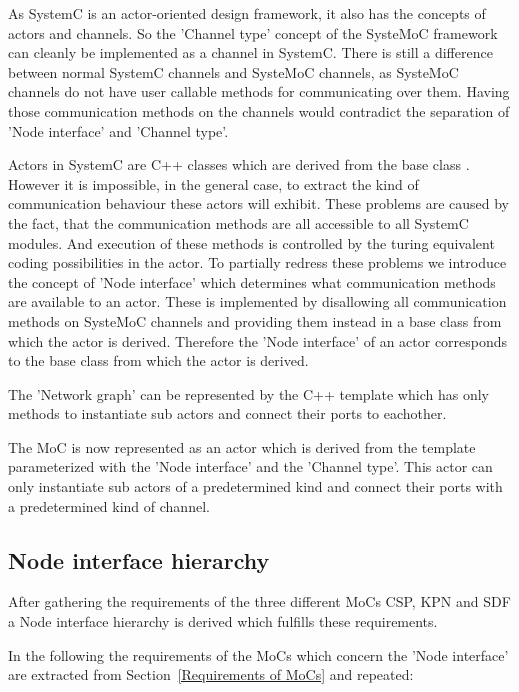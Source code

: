 As SystemC is an actor-oriented design framework, it also has the concepts of actors
and channels. So the 'Channel type' concept of the SysteMoC framework can cleanly be implemented
as a channel in SystemC. There is still a difference between normal SystemC channels and SysteMoC channels,
as SysteMoC channels do not have user callable methods for communicating over them.
Having those communication methods on the channels would contradict the separation
of 'Node interface' and 'Channel type'.

Actors in SystemC are C++ classes which are derived from the base class .
However it is impossible, in the general case, to extract the kind of communication
behaviour these actors will exhibit. These problems are caused by the fact, that the
communication methods are all accessible to all SystemC modules. And execution
of these methods is controlled by the turing equivalent coding possibilities in the actor.
To partially redress these problems we introduce the concept of 'Node interface' which
determines what communication methods are available to an actor. These is implemented
by disallowing all communication methods on SysteMoC channels and providing them instead
in a base class from which the actor is derived. Therefore the 'Node interface' of an actor
corresponds to the base class from which the actor is derived.

The 'Network graph' can be represented by the C++ template  
which has only methods to instantiate sub actors and connect their ports to eachother.

The MoC is  now represented as an actor which is derived from the 
template parameterized with the 'Node interface' and the 'Channel type'. This actor can only
instantiate sub actors of a predetermined kind and connect their ports with a  predetermined
kind of channel.

\subsection{Node interface hierarchy}
After gathering the requirements of the three different MoCs CSP, KPN
and SDF a Node interface hierarchy is derived which fulfills these requirements.

In the following the requirements of the MoCs which concern the 'Node interface' are
extracted from Section~\ref{Requirements of MoCs} and repeated:

